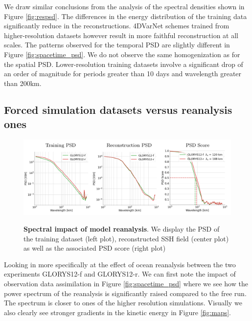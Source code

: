 \begin{bibunit}
We draw similar conclusions from the analysis of 
the spectral densities shown in Figure \ref{fig:respsd}. The differences in the energy distribution of the training data significantly reduce in the reconstructions. 4DVarNet schemes trained from higher-resolution datasets however result in more faithful reconstruction at all scales.
The patterns observed for the temporal PSD are slightly different in Figure \ref{fig:spacetime_psd}. We do not observe the same homogenization as for the spatial PSD. Lower-resolution training datasets involve a significant drop 
of an order of magnitude for periods greater than 10 days and wavelength greater than 200km.

\subsection{Forced simulation datasets versus reanalysis ones}
\label{ssec:reanalysis}

\begin{figure}[h]
\small
\begin{center}
    
\includegraphics[width=\linewidth]{./00_Simulearning/standalone_figures/psd_rea.png}
\caption{\textbf{Spectral impact of model reanalysis}. We display the PSD of the training dataset (left plot), reconstructed SSH field (center plot) as well as the associated PSD score (right plot)}
\vspace{-5mm}
\label{fig:reapsd}
\end{center}
\end{figure}
Looking in more specifically at the effect of ocean reanalysis between the two experiments GLORYS12-f and GLORYS12-r. We can first note the impact of observation data assimilation in Figure \ref{fig:spacetime_psd} where we see how the power spectrum of the reanalysis is significantly raised compared to the free run. The spectrum is closer to ones of the higher resolution simulations. Visually we also clearly see stronger gradients in the kinetic energy in Figure \ref{fig:maps}.


\end{bibunit}
